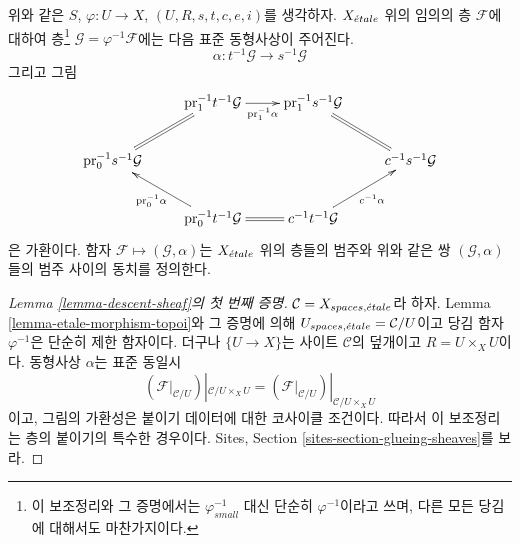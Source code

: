 \begin{lemma}
\label{lemma-descent-sheaf}
위와 같은 $S$, $\varphi : U \to X$, $(U, R, s, t, c, e, i)$를
생각하자. $X_{\acute{e}tale}$ 위의 임의의 층 $\mathcal{F}$에 대하여
층\footnote{이 보조정리와 그 증명에서는
$\varphi_{small}^{-1}$ 대신 단순히 $\varphi^{-1}$이라고 쓰며,
다른 모든 당김에 대해서도 마찬가지이다.}
$\mathcal{G} = \varphi^{-1}\mathcal{F}$에는 다음 표준 동형사상이
주어진다.
$$
\alpha :
t^{-1}\mathcal{G}
\longrightarrow
s^{-1}\mathcal{G}
$$
그리고 그림
$$
\xymatrix{
& \text{pr}_1^{-1}t^{-1}\mathcal{G} \ar[r]_-{\text{pr}_1^{-1}\alpha} &
\text{pr}_1^{-1}s^{-1}\mathcal{G} \ar@{=}[rd] & \\
\text{pr}_0^{-1}s^{-1}\mathcal{G} \ar@{=}[ru] & & &
c^{-1}s^{-1}\mathcal{G} \\
&
\text{pr}_0^{-1}t^{-1}\mathcal{G} \ar[lu]^{\text{pr}_0^{-1}\alpha} \ar@{=}[r] &
c^{-1}t^{-1}\mathcal{G} \ar[ru]_{c^{-1}\alpha}
}
$$
은 가환이다. 함자 $\mathcal{F} \mapsto (\mathcal{G}, \alpha)$는
$X_{\acute{e}tale}$ 위의 층들의 범주와 위와 같은 쌍
$(\mathcal{G}, \alpha)$들의 범주 사이의 동치를 정의한다.
\end{lemma}

\begin{proof}[Lemma \ref{lemma-descent-sheaf}의 첫 번째 증명]
$\mathcal{C} = X_{spaces, {\acute{e}tale}}$라 하자.
Lemma \ref{lemma-etale-morphism-topoi}와 그 증명에 의해
$U_{spaces, {\acute{e}tale}} = \mathcal{C}/U$이고 당김 함자
$\varphi^{-1}$은 단순히 제한 함자이다.
더구나 $\{U \to X\}$는 사이트 $\mathcal{C}$의 덮개이고
$R = U \times_X U$이다. 동형사상 $\alpha$는 표준 동일시
$$
\left(\mathcal{F}|_{\mathcal{C}/U}\right)|_{\mathcal{C}/U \times_X U}
=
\left(\mathcal{F}|_{\mathcal{C}/U}\right)|_{\mathcal{C}/U \times_X U}
$$
이고, 그림의 가환성은 붙이기 데이터에 대한 코사이클 조건이다.
따라서 이 보조정리는 층의 붙이기의 특수한 경우이다. Sites, Section
\ref{sites-section-glueing-sheaves}를 보라.
\end{proof}

